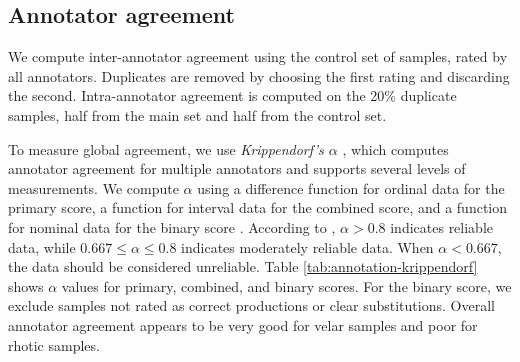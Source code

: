 \subsection{Annotator agreement}
\label{subsec:annotator-agreement}

We compute inter-annotator agreement using the control set of samples, rated by all annotators.
Duplicates are removed by choosing the first rating and discarding the second.
Intra-annotator agreement is computed on the 20\% duplicate samples, half from the main set and half from the control set.

To measure global agreement, we use \emph{Krippendorf's $\alpha$} \citep{krippendorff2004content}, which computes annotator 
agreement for multiple annotators and supports several levels of measurements.
We compute $\alpha$ using a difference function for ordinal data for the primary score, a function for interval data for the combined score, and a function for nominal data for the binary score \citep{krippendorff2011computing}.
According to \citet[pp 241-243]{krippendorff2004content}, $\alpha > 0.8$ indicates reliable data, while $0.667 \leqslant \alpha \leqslant 0.8$ indicates moderately reliable data. When $\alpha < 0.667$, the data should be considered unreliable.
Table \ref{tab:annotation-krippendorf} shows $\alpha$ values for primary, combined, and binary scores.
For the binary score, we exclude samples not rated as correct productions or clear substitutions.
Overall annotator agreement appears to be very good for velar samples and poor for rhotic samples.

\begin{table}
\centering
{}
\caption{Krippendorf's $\alpha$ for primary score $s_p$, combined score $s_c$, and binary score $s_b$ computed for all annotators across all, velar, and rhotic samples. Agreement for binary score excludes samples not rated as correct productions or clear substitutions.}
\label{tab:annotation-krippendorf}
\end{table}


